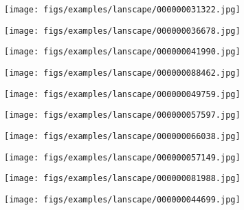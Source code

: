 \documentclass{article}
\begin{document}
	
	\begin{figure*}[t]
		\centering
		\begin{subfigure}{0.195\textwidth}
			\centering
			\texttt{[image: figs/examples/lanscape/000000031322.jpg]}
		\end{subfigure}
		\begin{subfigure}{0.195\textwidth}
			\centering
			\texttt{[image: figs/examples/lanscape/000000036678.jpg]}
		\end{subfigure}
		\begin{subfigure}{0.195\textwidth}
			\centering
			\texttt{[image: figs/examples/lanscape/000000041990.jpg]}
		\end{subfigure}
		\begin{subfigure}{0.195\textwidth}
			\centering
			\texttt{[image: figs/examples/lanscape/000000088462.jpg]}
		\end{subfigure}
		\begin{subfigure}{0.195\textwidth}
			\centering
			\texttt{[image: figs/examples/lanscape/000000049759.jpg]}
		\end{subfigure}
		
		\vspace{0.09cm}
		\begin{subfigure}{0.195\textwidth}
			\centering
			\texttt{[image: figs/examples/lanscape/000000057597.jpg]}
		\end{subfigure}
		\begin{subfigure}{0.195\textwidth}
			\centering
			\texttt{[image: figs/examples/lanscape/000000066038.jpg]}
		\end{subfigure}
		\begin{subfigure}{0.195\textwidth}
			\centering
			\texttt{[image: figs/examples/lanscape/000000057149.jpg]}
		\end{subfigure}
		\begin{subfigure}{0.195\textwidth}
			\centering
			\texttt{[image: figs/examples/lanscape/000000081988.jpg]}
		\end{subfigure}
		\begin{subfigure}{0.195\textwidth}
			\centering
			\texttt{[image: figs/examples/lanscape/000000044699.jpg]}
		\end{subfigure}
		

\end{figure*}
\end{document}
